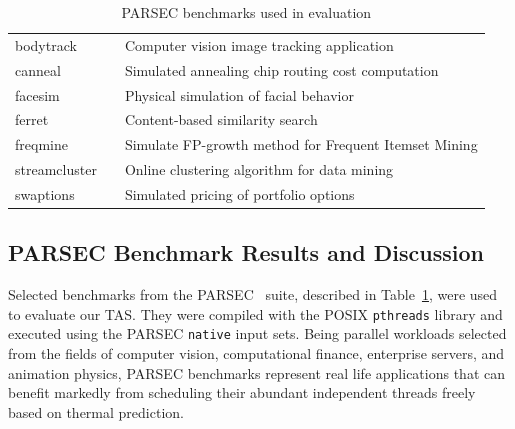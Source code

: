 \documentclass[times, 10pt,twocolumn]{IEEEtran}
\begin{document}
\begin{small}
\begin{table}[phbt] 
\centering
 \caption{PARSEC benchmarks used in evaluation}
\label{tab:parsecbench}
\begin{tabular}[bthp]{l l p{5cm}} 
\hline 
\hline 
bodytrack &  & Computer vision image tracking application \\
canneal &  & Simulated annealing chip routing cost computation \\
facesim &  & Physical simulation of facial behavior \\
ferret &  & Content-based similarity search \\
freqmine &  & Simulate FP-growth method for Frequent Itemset Mining \\
streamcluster &  & Online clustering algorithm for data mining \\
swaptions &  & Simulated pricing of portfolio options \\
\hline
\end{tabular}
\end{table}
\end{small}
\subsection{PARSEC Benchmark Results and Discussion}
\label{sec:mult-behav} 
Selected benchmarks from the PARSEC~\cite{Bienia2011} suite, described
in Table~\ref{tab:parsecbench}, were used to evaluate our TAS.
They were compiled with the POSIX \texttt{pthreads} library and executed
using the PARSEC \texttt{native} input sets.  Being parallel workloads
selected from the fields of computer vision, computational finance,
enterprise servers, and animation physics, PARSEC
benchmarks represent real life applications that 
can benefit markedly from scheduling their abundant independent threads
freely based on thermal prediction.
\end{document}
